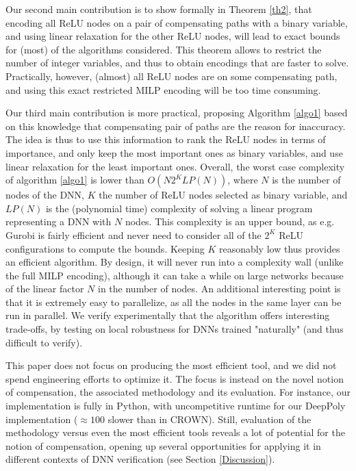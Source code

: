 Our second main contribution is to show formally in Theorem \ref{th2}, that 
encoding all ReLU nodes on a pair of compensating paths with a binary variable,
and using linear relaxation for the other ReLU nodes, will lead to exact bounds for (most) of the algorithms considered. This theorem allows to restrict the number of integer variables, and thus to obtain encodings that are faster to solve. Practically, however, (almost) all ReLU nodes are on some compensating path, and using this exact restricted MILP encoding will be too time consuming.

Our third main contribution is more practical, proposing Algorithm \ref{algo1} based on this knowledge that compensating pair of paths are the reason for inaccuracy. The idea is thus to use this information to rank the ReLU nodes in terms of importance, and only keep the most important ones as binary variables, and use linear relaxation for the least important ones.
Overall, the worst case complexity of algorithm \ref{algo1} is lower than $O(N 2^K LP(N))$, where $N$ is the number of nodes of the DNN, $K$ the number of ReLU nodes selected as binary variable, and $LP(N)$ is the (polynomial time) complexity of solving a linear program representing a DNN with $N$ nodes. This complexity is an upper bound, as e.g. Gurobi is fairly efficient and never need to consider all of the $2^K$ ReLU configurations to compute the bounds. Keeping $K$ reasonably low thus provides an efficient algorithm. 
By design, it will never run into a complexity wall (unlike the full MILP encoding), although it can take a while on large networks because of the linear factor $N$ in the number of nodes. An additional interesting point is that it is extremely easy to parallelize, as all the nodes in the same layer can be run in parallel. We verify experimentally that the algorithm offers interesting trade-offs, by testing on local robustness for DNNs trained "naturally" (and thus difficult to verify).

This paper does not focus on producing the most efficient tool, and we did not spend engineering efforts to optimize it. The focus is instead on the novel notion of compensation, the associated methodology and its evaluation. For instance, our implementation is fully in Python, with uncompetitive runtime for our DeepPoly implementation ($\approx 100$ slower than in CROWN). Still, evaluation of the methodology versus even the most efficient tools reveals a lot of potential for the notion of compensation, opening up several opportunities for applying it in different contexts of DNN verification (see Section \ref{Discussion}). 

